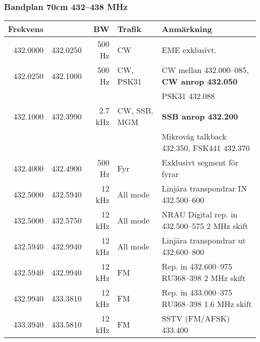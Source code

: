 \begin{landscape}
\subsubsection{Bandplan 70cm 432--438 MHz}
\begin{tabular}{rrrll}
	\textbf{Frekvens}         &               & \textbf{BW} & \textbf{Trafik} & \textbf{Anmärkning}                                          \\ \hline
	         432.0000         & 432.0250      & 500 Hz      & CW              & EME exklusivt.                                               \\ \hline
	         432.0250         & 432.1000      & 500 Hz      & CW, PSK31       & CW mellan 432.000--085, \textbf{CW anrop 432.050}            \\
                                  &               &             &                 & PSK31 432.088                                                \\ \hline
	         432.1000         & 432.3990      & 2.7 kHz     & CW, SSB, MGM    & \textbf{SSB anrop 432.200}                                   \\
                                  &               &             &                 & Mikrovåg talkback 432.350, FSK441 432.370                    \\ \hline
	         432.4000         & 432.4900      & 500 Hz      & Fyr             & Exklusivt segment för fyrar                                  \\ \hline
	         432.5000         & 432.5940      & 12 kHz      & All mode        & Linjära transpondrar IN 432.500--600                         \\ \hline
	         432.5000         & 432.5750      & 12 kHz      & All mode        & NRAU Digital rep. in 432.500--575 2 MHz skift                \\ \hline
	         432.5940         & 432.9940      & 12 kHz      & All mode        & Linjära transpondrar ut 432.600--800                         \\ \hline
	         432.5940         & 432.9940      & 12 kHz      & FM              & Rep. in 432.600--975 RU368--398 2 MHz skift                  \\ \hline
	         432.9940         & 433.3810      & 12 kHz      & FM              & Rep. in 433.000--375 RU368--398 1.6 MHz skift                \\ \hline
	         433.3940         & 433.5810      & 12 kHz      & FM              & SSTV (FM/AFSK) 433.400                                       \\

\end{tabular}
\end{landscape}
